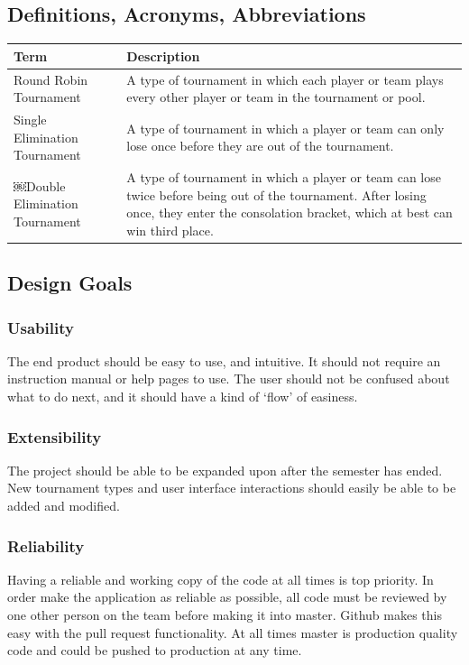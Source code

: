 \documentclass{article}
\begin{document}
\subsection{Definitions, Acronyms, Abbreviations}
\begin{table}[h]
	\centering
	\begin{tabular}{p{3cm} p{8cm}}
		\toprule
		Term & Description  \\

		\midrule

		Round Robin Tournament & A type of tournament in which each player or team plays every other player or team in the tournament or pool. 		\\
		\midrule
		Single Elimination Tournament & A type of tournament in which a player or team can only lose once before they are out of the tournament.	\\
		\midrule
		￼Double Elimination Tournament & A type of tournament in which a player or team can lose twice before being out of the tournament. After losing once, they enter the consolation bracket, which at best can win third place.	\\

		\bottomrule
	\end{tabular}
\end{table}

\newpage
\subsection{Design Goals}
\subsubsection{Usability}
The end product should be easy to use, and intuitive. It should not require an instruction manual or help pages to use. The user should not be confused about what to do next, and it should have a kind of ‘flow’ of easiness.

\subsubsection{Extensibility}
The project should be able to be expanded upon after the semester has ended. New tournament types and user interface interactions should easily be able to be added and modified.

\subsubsection{Reliability}
Having a reliable and working copy of the code at all times is top priority.  In order make the application as reliable as possible, all code must be reviewed by one other person on the team before making it into master.  Github makes this easy with the pull request functionality.  At all times master is production quality code and could be pushed to production at any time. 
\end{document}
